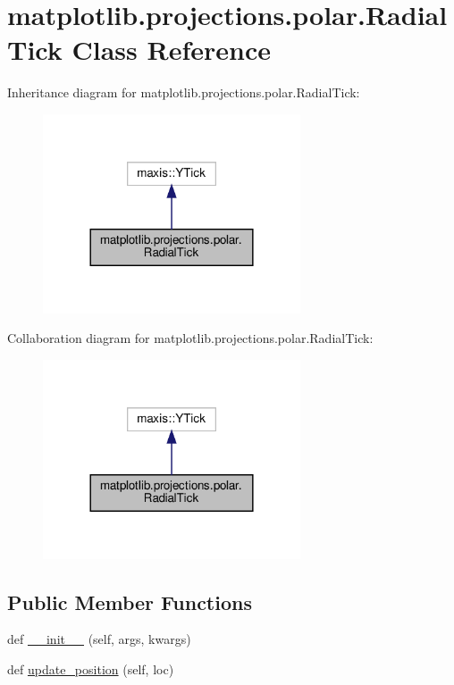 \hypertarget{classmatplotlib_1_1projections_1_1polar_1_1RadialTick}{}\section{matplotlib.\+projections.\+polar.\+Radial\+Tick Class Reference}
\label{classmatplotlib_1_1projections_1_1polar_1_1RadialTick}


Inheritance diagram for matplotlib.\+projections.\+polar.\+Radial\+Tick\+:
\nopagebreak
\begin{figure}[H]
\begin{center}
\leavevmode
\includegraphics[width=216pt]{classmatplotlib_1_1projections_1_1polar_1_1RadialTick__inherit__graph}
\end{center}
\end{figure}


Collaboration diagram for matplotlib.\+projections.\+polar.\+Radial\+Tick\+:
\nopagebreak
\begin{figure}[H]
\begin{center}
\leavevmode
\includegraphics[width=216pt]{classmatplotlib_1_1projections_1_1polar_1_1RadialTick__coll__graph}
\end{center}
\end{figure}
\subsection*{Public Member Functions}
\begin{DoxyCompactItemize}
\item 
def \hyperlink{classmatplotlib_1_1projections_1_1polar_1_1RadialTick_ac998797a93e328bd28a5f4677a8855c5}{\+\_\+\+\_\+init\+\_\+\+\_\+} (self, args, kwargs)
\item 
def \hyperlink{classmatplotlib_1_1projections_1_1polar_1_1RadialTick_a74569625df860499b06130547f59b80b}{update\+\_\+position} (self, loc)
\end{DoxyCompactItemize}


